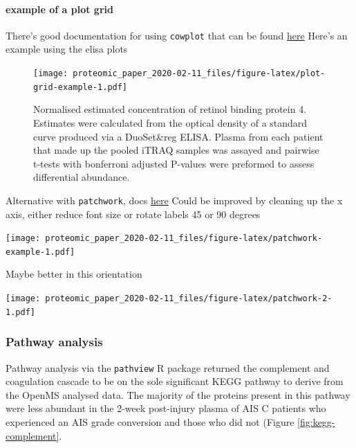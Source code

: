 \documentclass[
]{article}
\begin{document}
\hypertarget{example-of-a-plot-grid}{%
\paragraph{example of a plot grid}\label{example-of-a-plot-grid}}

There's good documentation for using \texttt{cowplot} that can be found \href{https://wilkelab.org/cowplot/articles/plot_grid.html}{here}
Here's an example using the elisa plots



\begin{figure}
\centering
\texttt{[image: proteomic\_paper\_2020-02-11\_files/figure-latex/plot-grid-example-1.pdf]}
\caption{\label{fig:plot-grid-example}Normalised estimated concentration of retinol binding protein 4. Estimates were calculated from the optical density of a standard curve produced via a DuoSet\&reg ELISA. Plasma from each patient that made up the pooled iTRAQ samples was assayed and pairwise t-tests with bonferroni adjusted P-values were preformed to assess differential abundance.}
\end{figure}

Alternative with \texttt{patchwork}, docs \href{https://patchwork.data-imaginist.com/index.html}{here}
Could be improved by cleaning up the x axis, either reduce font size or rotate labels 45 or 90 degrees

\texttt{[image: proteomic\_paper\_2020-02-11\_files/figure-latex/patchwork-example-1.pdf]}

Maybe better in this orientation

\texttt{[image: proteomic\_paper\_2020-02-11\_files/figure-latex/patchwork-2-1.pdf]}

\hypertarget{kegg-chap3}{%
\subsubsection{Pathway analysis}\label{kegg-chap3}}

Pathway analysis via the \texttt{pathview} R package returned the complement and coagulation cascade to be on the sole significant KEGG pathway to derive from the OpenMS analysed data.
The majority of the proteins present in this pathway were less abundant in the 2-week post-injury plasma of AIS C patients who experienced an AIS grade conversion and those who did not (Figure \ref{fig:kegg-complement}.
\end{document}
